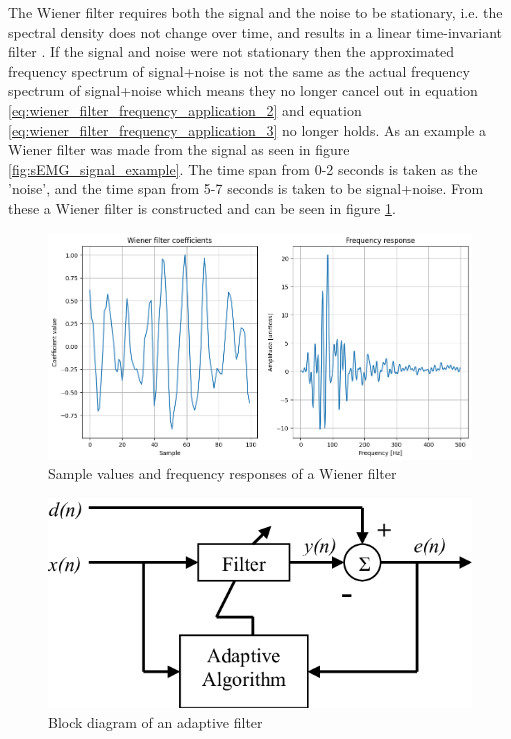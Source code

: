 The Wiener filter requires both the signal and the noise to be stationary, i.e. the spectral density does not change over time, and results in a linear time-invariant filter \cite{stationary_processes_definition} \cite{difference_stationary_nonstationary}. If the signal and noise were not stationary then the approximated frequency spectrum of signal+noise is not the same as the actual frequency spectrum of signal+noise which means they no longer cancel out in equation \ref{eq:wiener_filter_frequency_application_2} and equation \ref{eq:wiener_filter_frequency_application_3} no longer holds.
As an example a Wiener filter was made from the signal as seen in figure \ref{fig:sEMG_signal_example}. The time span from 0-2 seconds is taken as the 'noise', and the time span from 5-7 seconds is taken to be signal+noise. From these a Wiener filter is constructed and can be seen in figure \ref{fig:wiener_filter_response}.

\begin{figure}[h!t]
	\begin{center}
		\includegraphics[width=1.0\columnwidth]{images/wiener_filter_response.png}
	\end{center}
	\caption{Sample values and frequency responses of a Wiener filter}
	\label{fig:wiener_filter_response}
\end{figure}

\begin{figure}[h!t]
	\begin{center}
		\includegraphics[width=0.7\columnwidth]{images/adaptive_filter_block_diagram.png}
	\end{center}
	\caption{Block diagram of an adaptive filter \cite{introduction_optimal_signal_processing}}
	\label{fig:adaptive_filter_diagram}
\end{figure}

